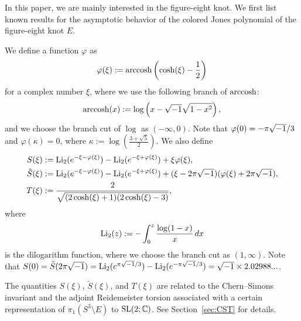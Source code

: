 \par
In this paper, we are mainly interested in the figure-eight knot.
We first list known results for the asymptotic behavior of the colored Jones polynomial of the figure-eight knot $E$.
\par
We define a function $\varphi$ as
\begin{equation*}
  \varphi(\xi)
  :=
  \operatorname{arccosh}\left(\cosh(\xi)-\frac{1}{2}\right)
\end{equation*}
for a complex number $\xi$, where we use the following branch of $\operatorname{arccosh}$:
\begin{equation*}
  \operatorname{arccosh}(x)
  :=
  \log\left(x-\sqrt{-1}\sqrt{1-x^2}\right),
\end{equation*}
and we choose the branch cut of $\log$ as $(-\infty,0)$.
Note that $\varphi(0)=-\pi\sqrt{-1}/3$ and $\varphi(\kappa)=0$, where $\kappa:=\log\left(\frac{3+\sqrt{5}}{2}\right)$.
We also define
\begin{align*}
  S(\xi)
  &:=
  \operatorname{Li}_2(e^{-\xi-\varphi(\xi)})-\operatorname{Li}_2(e^{-\xi+\varphi(\xi)})+\xi\varphi(\xi),
  \\
  \tilde{S}(\xi)
  &:=
  \operatorname{Li}_2(e^{-\xi-\varphi(\xi)})-\operatorname{Li}_2(e^{-\xi+\varphi(\xi)})
  +(\xi-2\pi\sqrt{-1})(\varphi(\xi)+2\pi\sqrt{-1}),
  \\
  T(\xi)
  &:=
  \frac{2}{\sqrt{(2\cosh(\xi)+1)(2\cosh(\xi)-3)}},
\end{align*}
where
\begin{equation*}
  \operatorname{Li}_2(z):=-\int_{0}^{z}\frac{\log(1-x)}{x}\,dx
\end{equation*}
is the dilogarithm function, where we choose the branch cut as $(1,\infty)$.
Note that $S(0)=\tilde{S}(2\pi\sqrt{-1})=\operatorname{Li}_2(e^{\pi\sqrt{-1}/3})-\operatorname{Li}_2(e^{-\pi\sqrt{-1}/3})=\sqrt{-1}\times 2.02988...$.
\par
The quantities $S(\xi)$, $\tilde{S}(\xi)$, and $T(\xi)$ are related to the Chern--Simons invariant and the adjoint Reidemeister torsion associated with a certain representation of $\pi_1\left(S^3\setminus{E}\right)$ to $\rm{SL}(2;\mathbb{C})$.
See Section~\ref{sec:CST} for details.
